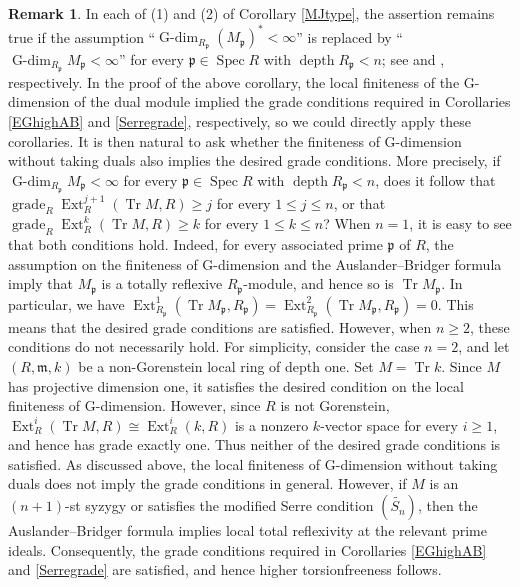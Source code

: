 \documentclass{amsart}
\theoremstyle{definition}
\newtheorem{rmk}[thm]{Remark}
\theoremstyle{remark}
\numberwithin{equation}{thm}
\def\depth{\operatorname{depth}}
\def\Ext{\operatorname{Ext}}
\def\Gdim{\operatorname{G-dim}}
\def\ge{\geqslant}
\def\grade{\operatorname{grade}}
\def\le{\leqslant}
\def\m{\mathfrak{m}}
\def\p{\mathfrak{p}}
\def\spec{\operatorname{Spec}}
\def\tr{\operatorname{Tr}}
\begin{document}
\begin{rmk}\label{nondual}
In each of (1) and (2) of Corollary \ref{MJtype}, the assertion remains true if the assumption ``$\Gdim_{R_\p}(M_\p)^*<\infty$'' is replaced by ``$\Gdim_{R_\p}M_\p<\infty$'' for every $\p\in\spec R$ with $\depth R_\p<n$; see \cite[Theorem 41]{Masek} and \cite[Theorem 2.12(b)]{DS}, respectively.
In the proof of the above corollary, the local finiteness of the G-dimension of the dual module implied the grade conditions required in Corollaries \ref{EGhighAB} and \ref{Serregrade}, respectively, so we could directly apply these corollaries. It is then natural to ask whether the finiteness of G-dimension without taking duals also implies the desired grade conditions. More precisely, if $\Gdim_{R_\p}M_\p<\infty$ for every $\p\in\spec R$ with $\depth R_\p<n$, does it follow that $\grade_R\Ext^{j+1}_R(\tr M,R)\ge j$ for every $1\le j\le n$, or that $\grade_R\Ext^k_R(\tr M,R)\ge k$ for every $1\le k\le n$?
When $n=1$, it is easy to see that both conditions hold. Indeed, for every associated prime $\p$ of $R$, the assumption on the finiteness of G-dimension and the Auslander--Bridger formula imply that $M_\p$ is a totally reflexive $R_\p$-module, and hence so is $\tr M_\p$. In particular, we have $\Ext^1_{R_\p}(\tr M_\p,R_\p)=\Ext^2_{R_\p}(\tr M_\p,R_\p)=0$. This means that the desired grade conditions are satisfied.
However, when $n\ge2$, these conditions do not necessarily hold. For simplicity, consider the case $n=2$, and let $(R,\m,k)$ be a non-Gorenstein local ring of depth one. Set $M=\tr k$. Since $M$ has projective dimension one, it satisfies the desired condition on the local finiteness of G-dimension. However, since $R$ is not Gorenstein, $\Ext^i_R(\tr M,R)\cong\Ext^i_R(k,R)$ is a nonzero $k$-vector space for every $i\ge1$, and hence has grade exactly one. Thus neither of the desired grade conditions is satisfied.
As discussed above, the local finiteness of G-dimension without taking duals does not imply the grade conditions in general. However, if $M$ is an $(n+1)$-st syzygy or satisfies the modified Serre condition $(\widetilde{S_n})$, then the Auslander--Bridger formula implies local total reflexivity at the relevant prime ideals. Consequently, the grade conditions required in Corollaries \ref{EGhighAB} and \ref{Serregrade} are satisfied, and hence higher torsionfreeness follows.
\end{rmk}
\end{document}
